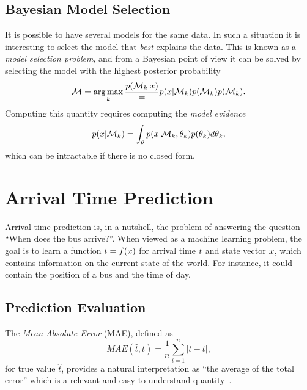 \subsection{Bayesian Model Selection}
It is possible to have several models for the same data. In such a
situation it is interesting to select the model that \textit{best} explains the
data. This is known as a \textit{model selection problem}, and from a
Bayesian point of view it can be solved by selecting the model with
the highest posterior probability
\begin{equation}
  \label{model-posterior-probability}
  \mathcal{M} = \operatorname*{arg\,max}_k \frac{p(\mathcal{M}_{k} \vert x)} 
  = p(x \vert \mathcal{M}_{k})p(\mathcal{M}_{k})p(\mathcal{M}_{k}).
\end{equation}
Computing this quantity requires computing the \textit{model evidence}
\begin{equation}
  \label{model-evidence}
  p(x \vert \mathcal{M}_k) = \int_{\theta} p(x \vert
  \mathcal{M}_k, \theta_k) p(\theta_k) d\theta_k,
\end{equation}
which can be intractable if there is no closed form.


\section{Arrival Time Prediction}
Arrival time prediction is, in a nutshell, the problem of answering
the question ``When does the bus arrive?''. When viewed as a machine
learning problem, the goal is to
learn a function $t = f(x)$ for arrival time $t$ and 
state vector $x$, which
contains information on the current state of the world. For instance, it
could contain the position of a bus and the time of day.

\subsection{Prediction Evaluation}
The \textit{Mean Absolute Error} (MAE), defined as
\begin{equation}
  \label{eq:mae}
  MAE(\hat{t}, t) = \frac{1}{n}\sum_{i=1}^{n}{\vert \hat{t} - t \vert},
\end{equation}
for true value $\hat{t}$, provides a natural interpretation as 
``the average of the total error'' which is a relevant
and easy-to-understand quantity~\cite{willmott2005advantages}.


